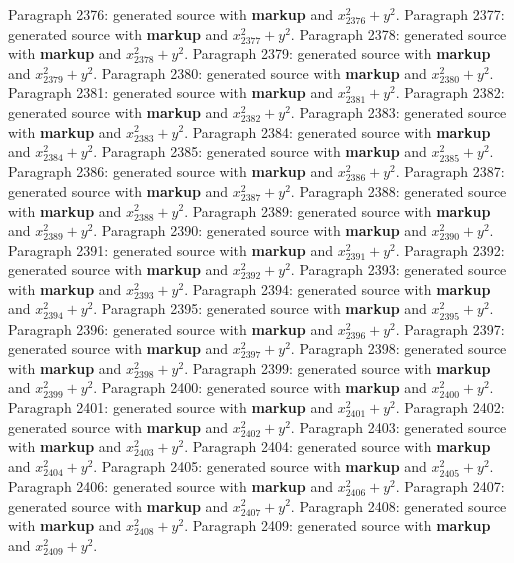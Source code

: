\documentclass{article}
\begin{document}
Paragraph 2376: generated source with \textbf{markup} and $x_{2376}^2 + y^2$.
Paragraph 2377: generated source with \textbf{markup} and $x_{2377}^2 + y^2$.
Paragraph 2378: generated source with \textbf{markup} and $x_{2378}^2 + y^2$.
Paragraph 2379: generated source with \textbf{markup} and $x_{2379}^2 + y^2$.
Paragraph 2380: generated source with \textbf{markup} and $x_{2380}^2 + y^2$.
Paragraph 2381: generated source with \textbf{markup} and $x_{2381}^2 + y^2$.
Paragraph 2382: generated source with \textbf{markup} and $x_{2382}^2 + y^2$.
Paragraph 2383: generated source with \textbf{markup} and $x_{2383}^2 + y^2$.
Paragraph 2384: generated source with \textbf{markup} and $x_{2384}^2 + y^2$.
Paragraph 2385: generated source with \textbf{markup} and $x_{2385}^2 + y^2$.
Paragraph 2386: generated source with \textbf{markup} and $x_{2386}^2 + y^2$.
Paragraph 2387: generated source with \textbf{markup} and $x_{2387}^2 + y^2$.
Paragraph 2388: generated source with \textbf{markup} and $x_{2388}^2 + y^2$.
Paragraph 2389: generated source with \textbf{markup} and $x_{2389}^2 + y^2$.
Paragraph 2390: generated source with \textbf{markup} and $x_{2390}^2 + y^2$.
Paragraph 2391: generated source with \textbf{markup} and $x_{2391}^2 + y^2$.
Paragraph 2392: generated source with \textbf{markup} and $x_{2392}^2 + y^2$.
Paragraph 2393: generated source with \textbf{markup} and $x_{2393}^2 + y^2$.
Paragraph 2394: generated source with \textbf{markup} and $x_{2394}^2 + y^2$.
Paragraph 2395: generated source with \textbf{markup} and $x_{2395}^2 + y^2$.
Paragraph 2396: generated source with \textbf{markup} and $x_{2396}^2 + y^2$.
Paragraph 2397: generated source with \textbf{markup} and $x_{2397}^2 + y^2$.
Paragraph 2398: generated source with \textbf{markup} and $x_{2398}^2 + y^2$.
Paragraph 2399: generated source with \textbf{markup} and $x_{2399}^2 + y^2$.
Paragraph 2400: generated source with \textbf{markup} and $x_{2400}^2 + y^2$.
Paragraph 2401: generated source with \textbf{markup} and $x_{2401}^2 + y^2$.
Paragraph 2402: generated source with \textbf{markup} and $x_{2402}^2 + y^2$.
Paragraph 2403: generated source with \textbf{markup} and $x_{2403}^2 + y^2$.
Paragraph 2404: generated source with \textbf{markup} and $x_{2404}^2 + y^2$.
Paragraph 2405: generated source with \textbf{markup} and $x_{2405}^2 + y^2$.
Paragraph 2406: generated source with \textbf{markup} and $x_{2406}^2 + y^2$.
Paragraph 2407: generated source with \textbf{markup} and $x_{2407}^2 + y^2$.
Paragraph 2408: generated source with \textbf{markup} and $x_{2408}^2 + y^2$.
Paragraph 2409: generated source with \textbf{markup} and $x_{2409}^2 + y^2$.
\end{document}
